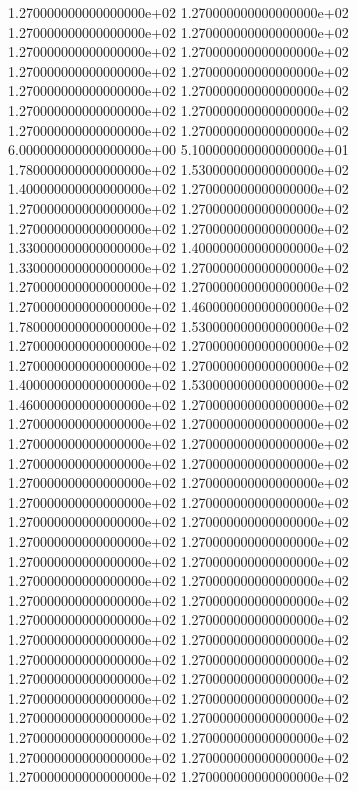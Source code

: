 1.270000000000000000e+02 1.270000000000000000e+02 1.270000000000000000e+02 1.270000000000000000e+02 1.270000000000000000e+02 1.270000000000000000e+02 1.270000000000000000e+02 1.270000000000000000e+02 1.270000000000000000e+02 1.270000000000000000e+02 1.270000000000000000e+02 1.270000000000000000e+02 1.270000000000000000e+02 1.270000000000000000e+02 6.000000000000000000e+00 5.100000000000000000e+01 1.780000000000000000e+02 1.530000000000000000e+02 1.400000000000000000e+02 1.270000000000000000e+02 1.270000000000000000e+02 1.270000000000000000e+02 1.270000000000000000e+02 1.270000000000000000e+02 1.330000000000000000e+02 1.400000000000000000e+02 1.330000000000000000e+02 1.270000000000000000e+02 1.270000000000000000e+02 1.270000000000000000e+02 1.270000000000000000e+02 1.460000000000000000e+02 1.780000000000000000e+02 1.530000000000000000e+02 1.270000000000000000e+02 1.270000000000000000e+02 1.270000000000000000e+02 1.270000000000000000e+02 1.400000000000000000e+02 1.530000000000000000e+02 1.460000000000000000e+02 1.270000000000000000e+02 1.270000000000000000e+02 1.270000000000000000e+02 1.270000000000000000e+02 1.270000000000000000e+02 1.270000000000000000e+02 1.270000000000000000e+02 1.270000000000000000e+02 1.270000000000000000e+02 1.270000000000000000e+02 1.270000000000000000e+02 1.270000000000000000e+02 1.270000000000000000e+02 1.270000000000000000e+02 1.270000000000000000e+02 1.270000000000000000e+02 1.270000000000000000e+02 1.270000000000000000e+02 1.270000000000000000e+02 1.270000000000000000e+02 1.270000000000000000e+02 1.270000000000000000e+02 1.270000000000000000e+02 1.270000000000000000e+02 1.270000000000000000e+02 1.270000000000000000e+02 1.270000000000000000e+02 1.270000000000000000e+02 1.270000000000000000e+02 1.270000000000000000e+02 1.270000000000000000e+02 1.270000000000000000e+02 1.270000000000000000e+02 1.270000000000000000e+02 1.270000000000000000e+02 1.270000000000000000e+02 1.270000000000000000e+02 1.270000000000000000e+02 1.270000000000000000e+02
